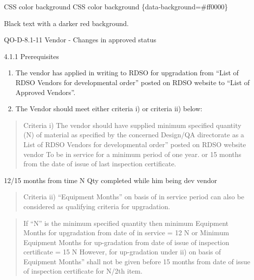 \documentclass[
  ignorenonframetext,
]{beamer}
\begin{document}
\begin{frame}{CSS color background}
\protect\hypertarget{css-color-background}{}
CSS color background \{data-background=\#ff0000\}


\begin{shaded}

Black text with a darker red background.

\end{shaded}
\end{frame}

\begin{frame}{QO-D-8.1-11 Vendor - Changes in approved status}
\protect\hypertarget{qo-d-8.1-11-vendor---changes-in-approved-status}{}
\begin{block}{4.1.1 Prerequisites}
\protect\hypertarget{prerequisites}{}
\begin{enumerate}[<+->]
[a)]
\item
  The vendor has applied in writing to RDSO for upgradation from ``List
  of RDSO Vendors for developmental order'' posted on RDSO website to
  ``List of Approved Vendors''.
\item
  The Vendor should meet either criteria i) or criteria ii) below:
\end{enumerate}

\begin{quote}
Criteria i) The vendor should have supplied minimum specified quantity
(N) of material as specified by the concerned Design/QA directorate as a
List of RDSO Vendors for developmental order'' posted on RDSO website
vendor To be in service for a minimum period of one year. or 15 months
from the date of issue of last inspection certificate.
\end{quote}

12/15 months from time N Qty completed while him being dev vendor

\begin{quote}
Criteria ii) ``Equipment Months'' on basis of in service period can also
be considered as qualifying criteria for upgradation.
\end{quote}

\begin{quote}
If ``N'' is the minimum specified quantity then minimum Equipment Months
for upgradation from date of in service = 12 N or Minimum Equipment
Months for up-gradation from date of issue of inspection certificate =
15 N However, for up-gradation under ii) on basis of Equipment Months''
shall not be given before 15 months from date of issue of inspection
certificate for N/2th item.
\end{quote}


\end{block}
\end{frame}
\end{document}
